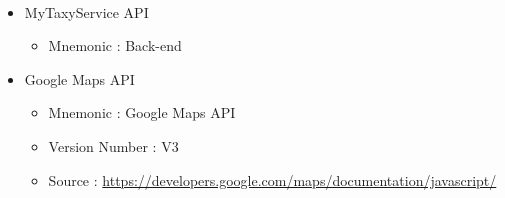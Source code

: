 \paragraph{}

\begin{itemize}
	\item MyTaxyService API
	\begin{itemize}
		\item Mnemonic : Back-end
	\end{itemize}
	\item Google Maps API
	\begin{itemize}
		\item Mnemonic : Google Maps API
		\item Version Number : V3
		\item Source : \url{https://developers.google.com/maps/documentation/javascript/} 
	\end{itemize}

\end{itemize}

